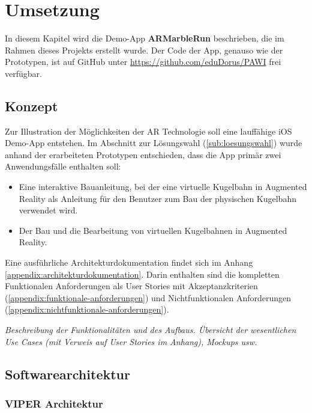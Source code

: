 \section{Umsetzung}

In diesem Kapitel wird die Demo-App \textbf{ARMarbleRun} beschrieben, die im Rahmen dieses Projekts erstellt wurde.
Der Code der App, genauso wie der Prototypen, ist auf GitHub unter \url{https://github.com/eduDorus/PAWI} frei verfügbar.

\subsection{Konzept}

Zur Illustration der Möglichkeiten der AR Technologie soll eine lauffähige iOS Demo-App entstehen.
Im Abschnitt zur Lösungswahl (\ref{sub:loesungswahl}) wurde anhand der erarbeiteten Prototypen entschieden, dass die App primär zwei Anwendungsfälle enthalten soll:

\begin{itemize}
	\item Eine interaktive Bauanleitung, bei der eine virtuelle Kugelbahn in Augmented Reality als Anleitung für den Benutzer zum Bau der physischen Kugelbahn verwendet wird.
	\item Der Bau und die Bearbeitung von virtuellen Kugelbahnen in Augmented Reality.
\end{itemize}

Eine ausführliche Architekturdokumentation findet sich im Anhang \ref{appendix:architekturdokumentation}.
Darin enthalten sind die kompletten Funktionalen Anforderungen als User Stories mit Akzeptanzkriterien (\ref{appendix:funktionale-anforderungen}) und Nichtfunktionalen Anforderungen (\ref{appendix:nichtfunktionale-anforderungen}).


\textit{Beschreibung der Funktionalitäten und des Aufbaus. Übersicht der wesentlichen Use Cases (mit Verweis auf User Stories im Anhang), Mockups usw.}

\subsection{Softwarearchitektur}

\subsubsection{VIPER Architektur}

